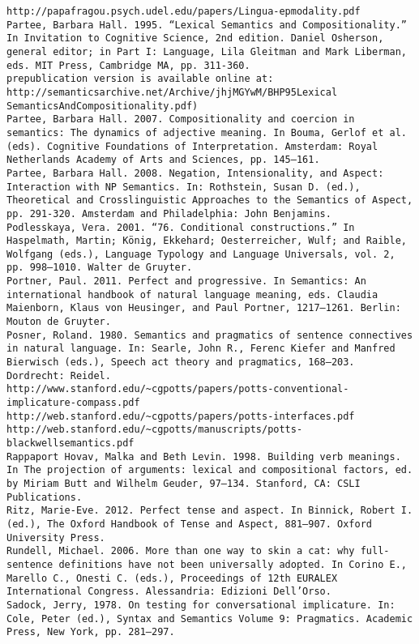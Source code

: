 \begin{verbatim}
http://papafragou.psych.udel.edu/papers/Lingua-epmodality.pdf
Partee, Barbara Hall. 1995. “Lexical Semantics and Compositionality.” In Invitation to Cognitive Science, 2nd edition. Daniel Osherson, general editor; in Part I: Language, Lila Gleitman and Mark Liberman, eds. MIT Press, Cambridge MA, pp. 311-360.
prepublication version is available online at: http://semanticsarchive.net/Archive/jhjMGYwM/BHP95Lexical SemanticsAndCompositionality.pdf)
Partee, Barbara Hall. 2007. Compositionality and coercion in semantics: The dynamics of adjective meaning. In Bouma, Gerlof et al. (eds). Cognitive Foundations of Interpretation. Amsterdam: Royal Netherlands Academy of Arts and Sciences, pp. 145–161.
Partee, Barbara Hall. 2008. Negation, Intensionality, and Aspect: Interaction with NP Semantics. In: Rothstein, Susan D. (ed.), Theoretical and Crosslinguistic Approaches to the Semantics of Aspect, pp. 291-320. Amsterdam and Philadelphia: John Benjamins.
Podlesskaya, Vera. 2001. “76. Conditional constructions.” In Haspelmath, Martin; König, Ekkehard; Oesterreicher, Wulf; and Raible, Wolfgang (eds.), Language Typology and Language Universals, vol. 2, pp. 998–1010. Walter de Gruyter.
Portner, Paul. 2011. Perfect and progressive. In Semantics: An international handbook of natural language meaning, eds. Claudia Maienborn, Klaus von Heusinger, and Paul Portner, 1217–1261. Berlin: Mouton de Gruyter.
Posner, Roland. 1980. Semantics and pragmatics of sentence connectives in natural language. In: Searle, John R., Ferenc Kiefer and Manfred Bierwisch (eds.), Speech act theory and pragmatics, 168–203. Dordrecht: Reidel.
http://www.stanford.edu/~cgpotts/papers/potts-conventional-implicature-compass.pdf
http://web.stanford.edu/~cgpotts/papers/potts-interfaces.pdf
http://web.stanford.edu/~cgpotts/manuscripts/potts-blackwellsemantics.pdf
Rappaport Hovav, Malka and Beth Levin. 1998. Building verb meanings. In The projection of arguments: lexical and compositional factors, ed. by Miriam Butt and Wilhelm Geuder, 97–134. Stanford, CA: CSLI Publications.
Ritz, Marie-Eve. 2012. Perfect tense and aspect. In Binnick, Robert I. (ed.), The Oxford Handbook of Tense and Aspect, 881–907. Oxford University Press.
Rundell, Michael. 2006. More than one way to skin a cat: why full-sentence definitions have not been universally adopted. In Corino E., Marello C., Onesti C. (eds.), Proceedings of 12th EURALEX International Congress. Alessandria: Edizioni Dell’Orso.
Sadock, Jerry, 1978. On testing for conversational implicature. In: Cole, Peter (ed.), Syntax and Semantics Volume 9: Pragmatics. Academic Press, New York, pp. 281–297.

\end{verbatim}
